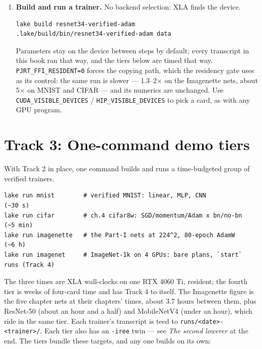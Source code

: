 \begin{enumerate}
  \item \textbf{Build and run a trainer.} No backend selection: XLA finds
    the device.
\begin{verbatim}
lake build resnet34-verified-adam
.lake/build/bin/resnet34-verified-adam data
\end{verbatim}
    Parameters stay on the device between steps by default; every
    transcript in this book ran that way, and the tiers below are timed
    that way. \texttt{PJRT\_FFI\_RESIDENT=0} forces the copying path, which
    the residency gate uses as its control: the same run is slower ---
    1.3--2$\times$ on the Imagenette nets, about 5$\times$ on MNIST and
    CIFAR --- and its numerics are unchanged. Use
    \texttt{CUDA\_VISIBLE\_DEVICES} / \texttt{HIP\_VISIBLE\_DEVICES} to
    pick a card, as with any GPU program.
\end{enumerate}

\section*{Track 3: One-command demo tiers}
\label{sec:getting_started_track3}

With Track 2 in place, one command builds and runs a time-budgeted group of
verified trainers.

\begin{verbatim}
lake run mnist        # verified MNIST: linear, MLP, CNN              (~30 s)
lake run cifar        # ch.4 cifar8w: SGD/momentum/Adam x bn/no-bn   (~5 min)
lake run imagenette   # the Part-I nets at 224^2, 80-epoch AdamW      (~6 h)
lake run imagenet     # ImageNet-1k on 4 GPUs: bare plans, `start` runs (Track 4)
\end{verbatim}

The three times are XLA wall-clocks on one RTX 4060 Ti, resident; the fourth
tier is weeks of four-card time and has Track 4 to itself. The Imagenette
figure is the five chapter nets at their chapters' times, about 3.7 hours
between them, plus ResNet-50 (about an hour and a half) and MobileNetV4
(under an hour), which ride in the same tier. Each trainer's transcript is
teed to \texttt{runs/<date>-<trainer>/}. Each tier also has an
\texttt{-iree} twin --- see \emph{The second lowerer} at the end. The tiers
bundle these targets, and any one builds on its own:

